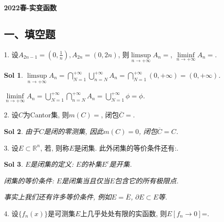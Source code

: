 \documentclass[UTF8]{article}
\newtheorem{solution}{Sol}
\begin{document}
  \begin{center}
    \LARGE \textbf{2022春-实变函数}
  \end{center}

  \subsection*{一、填空题}

  1. 设$A_{2n-1}=\left(0,\frac{1}{n}\right),A_{2n}=\left(0,2n\right)$, 则$\limsup \limits_{n \to +\infty}A_n=$\underline{\hspace{1cm}}, $\liminf \limits_{n \to +\infty}A_n=$\underline{\hspace{1cm}}.\par

  \begin{solution}
    $\limsup \limits_{n \to +\infty}A_n=\bigcap_{N=1}^{+\infty}\bigcup_{n=N}^{+\infty}A_n=\bigcap_{N=1}^{+\infty}\left(0,+\infty\right)=(0,+\infty)$.\par
    $\liminf \limits_{n \to +\infty}A_n=\bigcup_{N=1}^{+\infty}\bigcap_{n=N}^{+\infty}A_n=\bigcup_{N=1}^{+\infty}\phi = \phi$.\par
  \end{solution}
  
  2. 设$C$为Cantor集, 则$m(C)=$\underline{\hspace{1cm}}, 闭包$\overline{C}=$\underline{\hspace{1cm}}.\par

  \begin{solution}
    由于$C$是闭的零测集, 因此$m(C)=0$, 闭包$\overline{C}=C$.\par
  \end{solution}

  3. 设$E\subset \mathbb{R}^n$, 若\underline{\hspace{1cm}}, 则称$E$是闭集. 此外闭集的等价条件还有:\underline{\hspace{1cm}}.\par

  \begin{solution}
    $E$是闭集的定义: $E$的补集$E^c$是开集.\par
    闭集的等价条件: $E$是闭集当且仅当$E$包含它的所有极限点.\par
    事实上我们还有许多等价条件, 例如$E=\overline{E}$, $\partial E\subset E$等.\par
  \end{solution}

  4. 设$\{f_n(x)\}$是可测集$E$上几乎处处有限的实函数, 则$E\left[f_n\rightarrow 0\right]$=\underline{\hspace{1cm}}.\par
\end{document}
